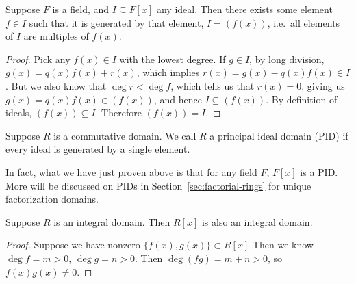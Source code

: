 \begin{corollary}\label{cor:field-polynomial-pid}
    Suppose \(F\) is a field,
    and \(I \subseteq F[x]\) any ideal.
    Then there exists some element \(f \in I\)
    such that it is generated by that element, \(I = (f(x))\),
    i.e.\ all elements of \(I\) are multiples of \(f(x)\).
\end{corollary}
\begin{proof}
    Pick any \(f(x) \in I\) with the lowest degree.
    If \(g \in I\), by \hyperref[prop:field-polynomial-long-div]{long division},
    \(g(x) = q(x)f(x) + r(x)\), which implies \(r(x) = g(x) - q(x)f(x) \in I\).
    But we also know that \(\deg r < \deg f\),
    which tells us that \(r(x) = 0\),
    giving us \(g(x) = q(x)f(x) \in (f(x))\), and hence \(I \subseteq (f(x))\).
    By definition of ideals, \((f(x)) \subseteq I\).
    Therefore \((f(x)) = I\).
\end{proof}

\begin{definition}
    Suppose \(R\) is a commutative domain.
    We call \(R\) a principal ideal domain (PID)
    if every ideal is generated by a single element.
\end{definition}
\begin{remark}
    In fact, what we have just proven \hyperref[cor:field-polynomial-pid]{above}
    is that for any field \(F\), \(F[x]\) is a PID.\@
    More will be discussed on PIDs
    in Section~\ref{sec:factorial-rings} for unique factorization domains.
\end{remark}

\begin{proposition}\label{prop:polynomial-domain}
    Suppose \(R\) is an integral domain.
    Then \(R[x]\) is also an integral domain.
\end{proposition}
\begin{proof}
    Suppose we have nonzero \(\{f(x),g(x)\} \subset R[x]\)
    Then we know \(\deg f = m > 0\), \(\deg g = n > 0\).
    Then \(\deg(fg) = m+n > 0\),
    so \(f(x)g(x) \neq 0\).
\end{proof}

